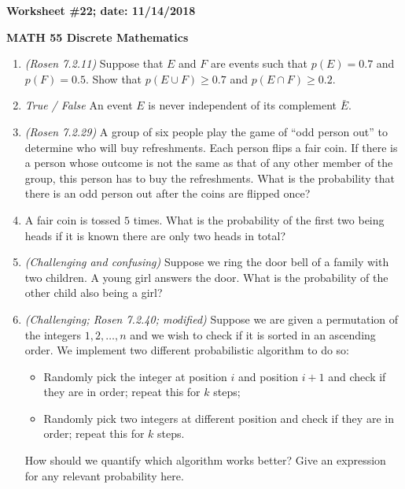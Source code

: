 \documentclass{article}
\begin{document}
{\bf Worksheet \#22; date: 11/14/2018}

{\bf MATH 55 Discrete Mathematics}

\begin{enumerate}
\item {\em (Rosen 7.2.11)} Suppose that $E$ and $F$ are events such that $p(E) = 0.7$ and $p(F) = 0.5$. Show that $p(E \cup F) \ge 0.7$ and $p(E \cap F) \ge 0.2$.

\item {\em True / False} An event $E$ is never independent of its complement 
$\bar{E}$.

\item {\em (Rosen 7.2.29)} A group of six people play the game of ``odd person out'' to determine who will buy refreshments. Each person flips a fair coin. If there is a person whose outcome is not the same as that of any other member of the group, this person has to buy the refreshments. What is the probability that there is an odd person out after the coins are flipped once?

\item A fair coin is tossed $5$ times. What is the probability of the first two being heads if it is known there are only two heads in total?

\item {\em (Challenging and confusing)} Suppose we ring the door bell of a family with two children. A young girl answers the door. What is the probability of the other child also being a girl?

\item {\em (Challenging; Rosen 7.2.40; modified)} Suppose we are given a permutation of the integers $1, 2, \ldots, n$ and we wish to check if it is sorted in an ascending order. We implement two different probabilistic algorithm to do so:
\begin{itemize}
\item Randomly pick the integer at position $i$ and position $i+1$ and check if they are in order; repeat this for $k$ steps;
\item Randomly pick two integers at different position and check if they are in order; repeat this for $k$ steps.
\end{itemize}
How should we quantify which algorithm works better? Give an expression for any relevant probability here.
\end{enumerate}
\end{document}
